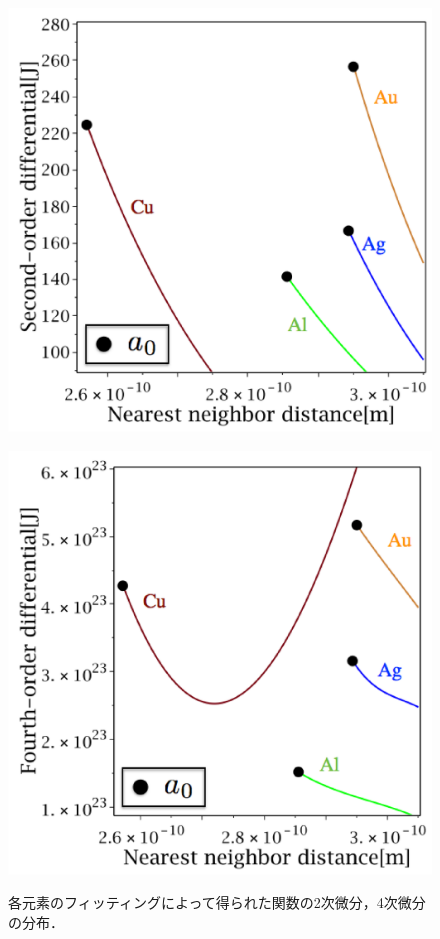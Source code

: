 \begin{figure}[htbp]
 \begin{minipage}[b]{0.5\linewidth}
  \centering
  \includegraphics[keepaspectratio, scale=0.41]
  {../image/all_k_label.eps}
  \label{allk}
 \end{minipage}
 \begin{minipage}[b]{0.5\linewidth}
  \centering
  \includegraphics[keepaspectratio, scale=0.41]
  {../image/all_gamma_label.eps}
  \label{allgamma}
 \end{minipage}
  \caption{各元素のフィッティングによって得られた関数の2次微分，4次微分の分布．}\label{fig:allkgamma}
\end{figure}


